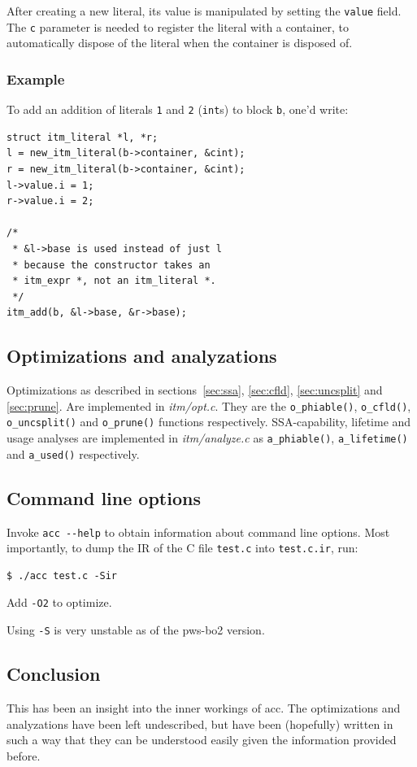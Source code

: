 \documentclass[12pt, a4paper]{article}
\begin{document}
After creating a new literal, its value is manipulated by setting the
\verb+value+ field. The \verb+c+ parameter is needed to register the literal
with a container, to automatically dispose
of the literal when the container is disposed of.

\subsubsection{Example}
To add an addition of literals \verb+1+ and \verb+2+ (\verb+int+s) to block
\verb+b+, one'd write:

\begin{lstlisting}
struct itm_literal *l, *r;
l = new_itm_literal(b->container, &cint);
r = new_itm_literal(b->container, &cint);
l->value.i = 1;
r->value.i = 2;

/*
 * &l->base is used instead of just l
 * because the constructor takes an
 * itm_expr *, not an itm_literal *.
 */
itm_add(b, &l->base, &r->base);
\end{lstlisting}


\subsection{Optimizations and analyzations}
Optimizations as described in sections~\ref{sec:ssa}, \ref{sec:cfld},
\ref{sec:uncsplit} and \ref{sec:prune}. Are implemented in \textit{itm/opt.c}.
They are the \verb+o_phiable()+, \verb+o_cfld()+, \verb+o_uncsplit()+ and
\verb+o_prune()+ functions respectively. SSA-capability, lifetime and usage
analyses are implemented in \textit{itm/analyze.c} as \verb+a_phiable()+,
\verb+a_lifetime()+ and \verb+a_used()+ respectively.

\subsection{Command line options}
Invoke \verb+acc --help+ to obtain information about command line options. Most
importantly, to dump the IR of the C file \verb+test.c+ into \verb+test.c.ir+, run:

\begin{lstlisting}
$ ./acc test.c -Sir
\end{lstlisting}

Add \verb+-O2+ to optimize.

Using \verb+-S+ is very unstable as of the pws-bo2 version.

\subsection{Conclusion}
This has been an insight into the inner workings of acc. The optimizations
and analyzations have been left undescribed, but have been (hopefully) written
in such a way that they can be understood easily given the information provided
before.
\end{document}
